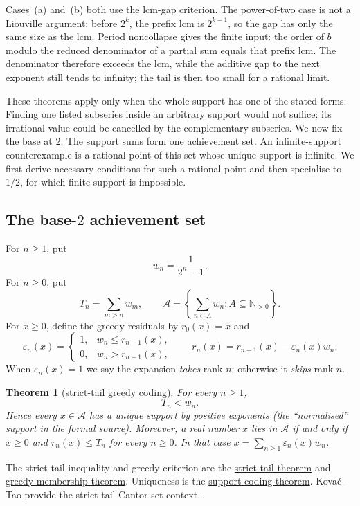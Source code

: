\documentclass[11pt]{article}
\newcommand{\commit}{312b96c0d149ed466725c62d4ef24cfc91bca34e}
\newcommand{\repobase}{https://github.com/wcook04/plectis-lean-erdos249-257/blob/\commit}
\newcommand{\PK}{Erdos249257}
\newcommand{\lword}[4]{\href{\repobase/\PK/#1\#L#2}{#4}}
\newtheorem{theorem}{Theorem}[section]
\theoremstyle{definition}
\theoremstyle{remark}
\newcommand{\Npos}{\mathbb{N}_{>0}}
\begin{document}
Cases~\textup{(a)} and~\textup{(b)} both use the lcm-gap criterion.  The
power-of-two case is not a Liouville argument: before \(2^k\), the prefix lcm is
\(2^{k-1}\), so the gap has only the same size as the lcm.  Period noncollapse
gives the finite input: the order of \(b\) modulo the reduced denominator of a
partial sum equals that prefix lcm.  The denominator therefore exceeds the lcm,
while the additive gap to the next exponent still tends to infinity; the tail
is then too small for a rational limit.

These theorems apply only when the whole support has one of the stated forms.
Finding one listed subseries inside an arbitrary support would not suffice:
its irrational value could be cancelled by the complementary subseries.  We
now fix the base at \(2\).  The support sums form one achievement set.  An
infinite-support counterexample is a rational point of this set whose unique
support is infinite.  We first derive necessary conditions for such a rational point and
then specialise to \(1/2\), for which finite support is impossible.

\subsection{The base-$2$ achievement set}

For \(n\geq1\), put
\[
 w_n=\frac1{2^n-1}.
\]
For \(n\geq0\), put
\[
 T_n=\sum_{m>n}w_m,
 \qquad
 \mathcal A=\left\{\sum_{n\in A}w_n:A\subseteq\Npos\right\}.
\]
For \(x\geq0\), define the greedy residuals by \(r_0(x)=x\) and
\[
 \varepsilon_n(x)=
 \begin{cases}
  1,&w_n\leq r_{n-1}(x),\\
  0,&w_n>r_{n-1}(x),
 \end{cases}
 \qquad
 r_n(x)=r_{n-1}(x)-\varepsilon_n(x)w_n.
\]
When \(\varepsilon_n(x)=1\) we say the expansion \emph{takes} rank \(n\);
otherwise it \emph{skips} rank \(n\).

\begin{theorem}[strict-tail greedy coding]\label{res:greedy}
For every \(n\geq1\),
\[
 T_n<w_n.
\]
Hence every \(x\in\mathcal A\)
has a unique support by positive exponents (the ``normalised'' support in the
formal source).
Moreover, a real number \(x\) lies in \(\mathcal A\) if and only if \(x\geq0\)
and \(r_n(x)\leq T_n\) for every \(n\geq0\).  In that case
\(x=\sum_{n\geq1}\varepsilon_n(x)w_n\).
\end{theorem}
\noindent The strict-tail inequality and greedy criterion are the
\lword{GreedyAchievementSet.lean}{180}{mersenneTail_lt_weight}{strict-tail theorem}
and
\lword{GreedyAchievementSet.lean}{1445}{mem_mersenneAchievementSet_iff_greedy_survival}{greedy membership theorem}.
Uniqueness is the
\lword{GreedyAchievementSet.lean}{1527}{positiveMersenneSupportValue_injective_normalized}{support-coding theorem}.
Kova\v{c}--Tao provide the strict-tail Cantor-set context~\cite[Remark~4.1]{kovactao}.
\end{document}
